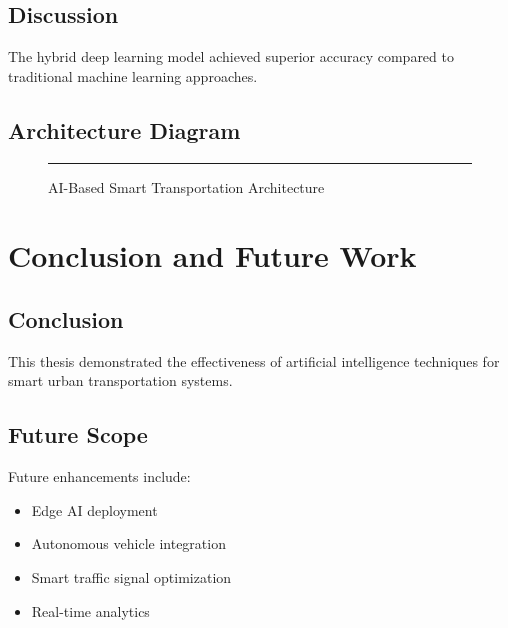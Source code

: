 \documentclass[12pt,a4paper]{report}
\begin{document}
	\section{Discussion}
	
	The hybrid deep learning model achieved superior accuracy compared to traditional machine learning approaches.
	
	\section{Architecture Diagram}
	
	\begin{figure}[h]
		
		\centering
		
		\rule{12cm}{6cm}
		
		\caption{AI-Based Smart Transportation Architecture}
		
	\end{figure}
	

	\chapter{Conclusion and Future Work}
	
	\section{Conclusion}
	
	This thesis demonstrated the effectiveness of artificial intelligence techniques for smart urban transportation systems.
	
	\section{Future Scope}
	
	Future enhancements include:
	
	\begin{itemize}
		
		\item Edge AI deployment
		
		\item Autonomous vehicle integration
		
		\item Smart traffic signal optimization
		
		\item Real-time analytics
		
	\end{itemize}
	
\end{document}
